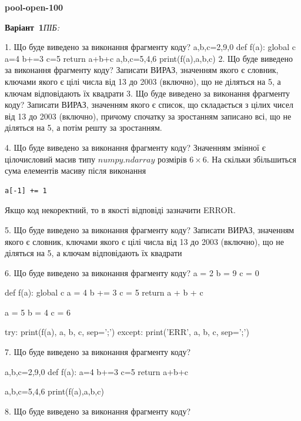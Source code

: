 \documentclass[11pt]{article}
\begin{document}
{\large\textbf{pool-open-100}}

\textbf{Варіант \No\,1}\hfill \textit{ПІБ:}\,\underline{\hspace{60mm}}
\vspace{4mm}

1. Що буде виведено за виконання фрагменту коду?
a,b,c=2,9,0
    def f(a):
      global c      a=4
      b+=3
      c=5
      return a+b+c
    a,b,c=5,4,6
    print(f(a),a,b,c)
2. Що буде виведено за виконання фрагменту коду?
Записати ВИРАЗ, значенням якого є словник, ключами якого є цілі числа від 13 до 2003 (включно), що не діляться на 5, а ключам відповідають їх квадрати 
3. Що буде виведено за виконання фрагменту коду?
Записати ВИРАЗ, значенням якого є список, що складається з цілих чисел від 13 до 2003 (включно), причому спочатку за зростанням записано всі, що не діляться на 5, а потім решту за зростанням.

4. Що буде виведено за виконання фрагменту коду?
Значенням змінної  є цілочисловий масив типу $numpy.ndarray$ розмірів $6{\times}6$. На скільки збільшиться сума елементів масиву  після виконання
\begin{verbatim}
a[-1] += 1
\end{verbatim}


Якщо код некоректний, то в якості відповіді зазначити ERROR.



5. Що буде виведено за виконання фрагменту коду?
Записати ВИРАЗ, значенням якого є словник, ключами якого є цілі числа від 13 до 2003 (включно), що не діляться на 5, а ключам відповідають їх квадрати 

6. Що буде виведено за виконання фрагменту коду?
a = 2
b = 9
c = 0

def f(a):
global c    a = 4
    b += 3
    c = 5
    return a + b + c

a = 5
b = 4
c = 6

try:
    print(f(a), a, b, c, sep=';')
except:
    print('ERR', a, b, c, sep=';')

7. Що буде виведено за виконання фрагменту коду?

a,b,c=2,9,0
def f(a):
    a=4
    b+=3
    c=5
    return a+b+c

a,b,c=5,4,6
print(f(a),a,b,c)

8. Що буде виведено за виконання фрагменту коду?
\end{document}
